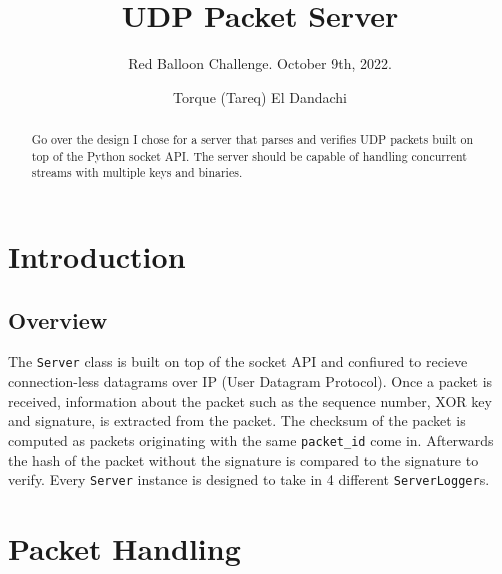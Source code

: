 \documentclass[acmtog,review]{acmart}
\begin{document}
\title{UDP Packet Server}
\subtitle{Red Balloon Challenge. October 9th, 2022.}

\author{Torque (Tareq) El Dandachi}

\renewcommand{\shortauthors}{Torque (Tareq) El Dandachi}

\renewcommand\footnotetextcopyrightpermission[1]{} %
\pagestyle{plain} %
\fancyfoot{}

\makeatletter
\let\@authorsaddresses\@empty
\makeatother


\begin{abstract}
Go over the design I chose for a server that parses and verifies 
UDP packets built on top of the Python socket API. The server 
should be capable of handling concurrent streams with multiple
keys and binaries. 
\end{abstract}

\maketitle
\thispagestyle{empty}

\section{Introduction}
 
\subsection{Overview}

The \texttt{Server} class is built on top of the socket API and
confiured to recieve connection-less datagrams over
IP (User Datagram Protocol). Once a packet is 
received, information about the packet such as the 
sequence number, XOR key and signature, is extracted
from the packet. The checksum of the packet is computed
as packets originating with the same \texttt{packet\_id}
come in. Afterwards the hash of the packet without the
signature is compared to the signature to verify.
Every \texttt{Server} instance is designed to take
in 4 different \texttt{ServerLogger}s.


\section{Packet Handling}
\label{packets}
\end{document}

